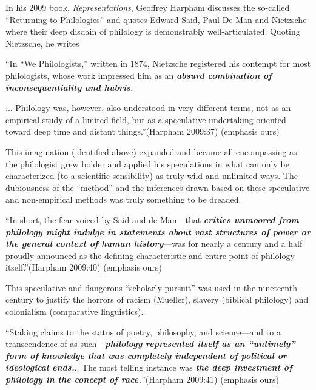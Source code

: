 In his 2009 book, \textit{Representations}, Geoffrey Harpham discusses the so-called “Returning to Philologies” and quotes Edward Said, Paul De Man and Nietzsche where their deep disdain of philology is demonstrably well-articulated. Quoting Nietzsche, he writes

“In “We Philologists,” written in 1874, Nietzsche registered his contempt for most philologists, whose work impressed him as an \textbf{\textit{absurd combination of inconsequentiality and hubris.}}

\begin{myquote}
... Philology was, however, also understood in very different terms, not as an empirical study of a limited field, but as a speculative undertaking oriented toward deep time and distant things.”\hfill (Harpham 2009:37) (emphasis ours)
\end{myquote}

This imagination (identified above) expanded and became all-encompassing as the philologist grew bolder and applied his speculations in what can only be characterized (to a scientific sensibility) as truly wild and unlimited ways. The dubiousness of the “method” and the inferences drawn based on these speculative and non-empirical methods was truly something to be dreaded.

\begin{myquote}
“In short, the fear voiced by Said and de Man—that \textbf{\textit{critics unmoored from philology might indulge in statements about vast structures of power or the general context of human history}}—was for nearly a century and a half proudly announced as the defining characteristic and entire point of philology itself.”\hfill (Harpham 2009:40) (emphasis ours)
\end{myquote}

This speculative and dangerous “scholarly pursuit” was used in the nineteenth century to justify the horrors of racism (Mueller), slavery (biblical philology) and colonialism (comparative linguistics).

\begin{myquote}
“Staking claims to the status of poetry, philosophy, and science—and to a transcendence of as such—\textbf{\textit{philology represented itself as an “untimely” form of knowledge that was completely independent of political or ideological ends.}}.. The most telling instance was \textbf{\textit{the deep investment of philology in the concept of race.}}”\hfill (Harpham 2009:41) (emphasis ours)
\end{myquote}

